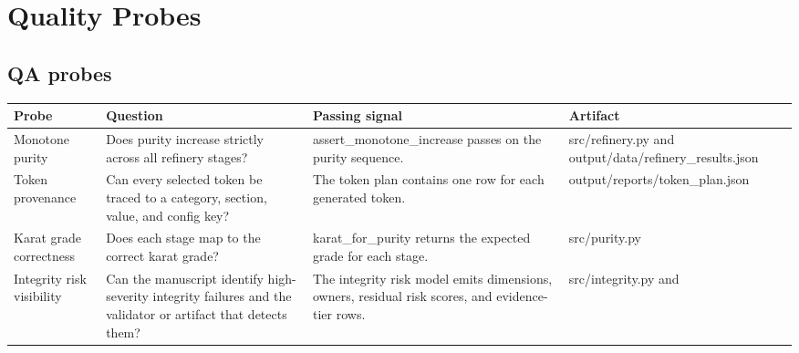 \documentclass[
  english,
]{article}
\newcounter{none} %
\begin{document}
\newpage

\section{Quality Probes}\label{sec:evaluation}

\subsection{QA probes}\label{qa-probes}

{\def\LTcaptype{none} %
\begin{longtable}[]{@{}
  >{\raggedright\arraybackslash}p{}
  >{\raggedright\arraybackslash}p{}
  >{\raggedright\arraybackslash}p{}
  >{\raggedright\arraybackslash}p{}@{}}
\toprule\noalign{}
\begin{minipage}[b]{\linewidth}\raggedright
Probe
\end{minipage} & \begin{minipage}[b]{\linewidth}\raggedright
Question
\end{minipage} & \begin{minipage}[b]{\linewidth}\raggedright
Passing signal
\end{minipage} & \begin{minipage}[b]{\linewidth}\raggedright
Artifact
\end{minipage} \\
\midrule\noalign{}
\endhead
\bottomrule\noalign{}
\endlastfoot
Monotone purity & Does purity increase strictly across all refinery
stages? & assert\_monotone\_increase passes on the purity sequence. &
src/refinery.py and output/data/refinery\_results.json \\
Token provenance & Can every selected token be traced to a category,
section, value, and config key? & The token plan contains one row for
each generated token. & output/reports/token\_plan.json \\
Karat grade correctness & Does each stage map to the correct karat
grade? & karat\_for\_purity returns the expected grade for each stage. &
src/purity.py \\
Integrity risk visibility & Can the manuscript identify high-severity
integrity failures and the validator or artifact that detects them? &
The integrity risk model emits dimensions, owners, residual risk scores,
and evidence-tier rows. & src/integrity.py and

\end{longtable}}
\end{document}
